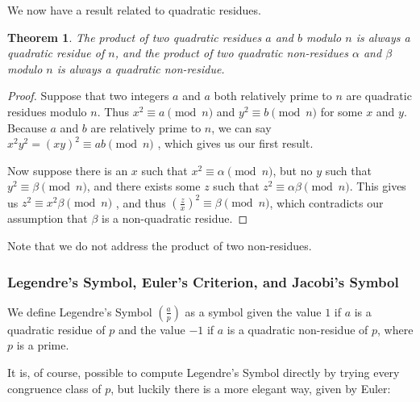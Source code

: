 \documentclass{article}
\theoremstyle{plain}
\begin{document}
\par We now have a result related to quadratic residues.
 \newtheorem*{theorem}{Theorem}
 \begin{theorem}
 The product of two quadratic residues $a$ and $b$ modulo $n$ is always a quadratic residue of $n$, and the product of two quadratic non-residues $\alpha$ and $\beta$ modulo $n$ is always a quadratic non-residue.
 \end{theorem}
 \begin{proof}
 Suppose that two integers $a$ and $a$ both relatively prime to $n$ are quadratic residues modulo $n$. Thus $x^2 \equiv a
  \pmod n$ and $y^2 \equiv b \pmod n$ for some $x$ and $y$. Because $a$ and $b$ are relatively prime to $n$, we can say
   $x^2y^2 = (xy)^2 \equiv ab \pmod n$ , which gives us our first result.
 \par Now suppose there is an $x$ such that  $x^2 \equiv \alpha \pmod n$, but no $y$ such that  $y^2 \equiv \beta \pmod n$,
  and there exists some $z$ such that $z^2 \equiv \alpha\beta \pmod n$. This gives us $z^2 \equiv x^2 \beta \pmod n$ , and thus 
  $\left( \frac{z}{x} \right)^2 \equiv \beta \pmod n$, which contradicts our assumption that $\beta$ is a non-quadratic residue.
 \end{proof}
 
 \par Note that we do not address the product of two non-residues.
 
 
\subsubsection{Legendre's Symbol, Euler's Criterion, and Jacobi's Symbol}
We define Legendre's Symbol $\left( \frac{a}{p} \right)$ as a symbol given the value $1$ if $a$ is a quadratic residue of $p$ and the value $-1$ if $a$ is a quadratic non-residue of $p$, where $p$ is a prime.
\par It is, of course, possible to compute Legendre's Symbol directly by trying every congruence class of $p$, but luckily there is a more elegant way, given by Euler:
\end{document}
